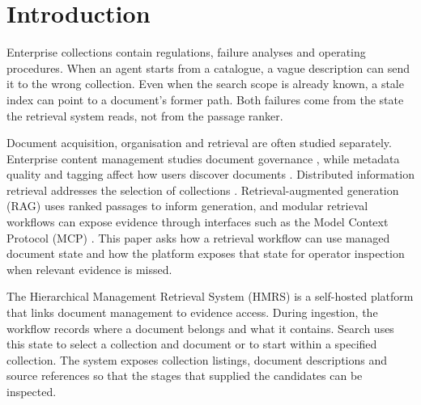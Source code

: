 \section{Introduction}
\label{sec:intro}

Enterprise collections contain regulations, failure analyses and operating
procedures. When an agent starts from a catalogue, a vague description can
send it to the wrong collection. Even when the search scope is already
known, a stale index can point to a document's former path. Both failures
come from the state the retrieval system reads, not from the passage ranker.

Document acquisition, organisation and retrieval are often studied
separately. Enterprise content management studies document
governance \cite{paivarinta-ecm-2005,tyrvaainen-ecm-2006}, while metadata
quality and tagging affect how users discover documents
\cite{park-metadata-quality-2009,golder-tagging-2006}. Distributed
information retrieval addresses the selection of collections
\cite{callan1995searching,si2003redde}. Retrieval-augmented generation
(RAG) uses ranked passages to inform generation, and modular retrieval
workflows can expose evidence through interfaces such as the Model
Context Protocol (MCP) \cite{rag-lewis,dpr,modular-rag,mcp,gao-rag-survey-2023}.
This paper asks how a retrieval workflow can use managed document state
and how the platform exposes that state for operator inspection when
relevant evidence is missed.

The Hierarchical Management Retrieval System (HMRS) is a self-hosted
platform that links document management to evidence access. During
ingestion, the workflow records where a document belongs and what it
contains. Search uses this state to select a collection and document or
to start within a specified collection. The system exposes collection
listings, document descriptions and source references so that the stages
that supplied the candidates can be inspected.

